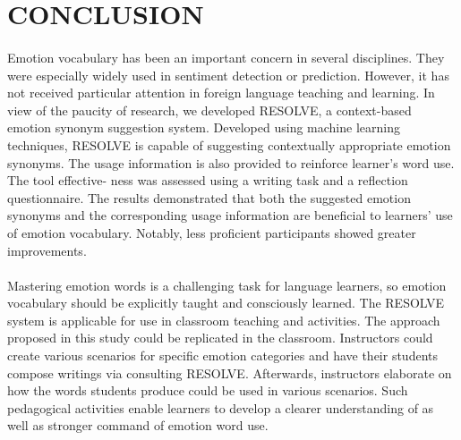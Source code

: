 \documentclass[a4paper,12pt,oneside]{article}
\begin{document}
\newpage
\section{CONCLUSION}
\paragraph{}
Emotion vocabulary has been an important concern in several disciplines. They were especially widely used in sentiment detection or prediction. However, it has not received particular attention in foreign language teaching and learning. In view of the paucity of research, we developed RESOLVE, a context-based emotion synonym suggestion system. Developed using machine learning techniques, RESOLVE is capable of suggesting contextually appropriate emotion synonyms. The usage information is also provided to reinforce learner’s word use. The tool effective- ness was assessed using a writing task and a reflection questionnaire. The results demonstrated that both the suggested emotion synonyms and the corresponding usage information are beneficial to learners’ use of emotion vocabulary. Notably, less proficient participants showed greater improvements.
\paragraph{}
Mastering emotion words is a challenging task for language learners, so emotion vocabulary should be explicitly taught and consciously learned. The RESOLVE system is applicable for use in classroom teaching and activities. The approach proposed in this study could be replicated in the classroom. Instructors could create various scenarios for specific emotion categories and have their students compose writings via consulting RESOLVE. Afterwards, instructors elaborate on how the words students produce could be used in various scenarios. Such pedagogical activities enable learners to develop a clearer understanding of as well as stronger command of emotion word use. 
\end{document}
